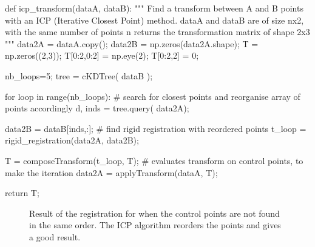 \begin{python}
def icp_transform(dataA, dataB):
    """
    Find a transform between A and B points
    with an ICP (Iterative Closest Point) method.
    dataA and dataB are of size nx2, with the same number of points n 
    returns the transformation matrix of shape 2x3
    """
    data2A = dataA.copy();
    data2B = np.zeros(data2A.shape);  
    T = np.zeros((2,3));
    T[0:2,0:2] = np.eye(2);
    T[0:2,2] = 0;
    
    nb_loops=5;
    tree = cKDTree( dataB );
    
    for loop in range(nb_loops):
        # search for closest points and reorganise array of points accordingly
        d, inds = tree.query( data2A);
        
        data2B = dataB[inds,:];
        # find rigid registration with reordered points
        t_loop = rigid_registration(data2A, data2B);
        
        T = composeTransform(t_loop, T);
        # evaluates transform on control points, to make the iteration
        data2A = applyTransform(dataA, T);
        
    return T;
\end{python}


\begin{figure}[htbp]
\centering\caption{Result of the registration for when the control points are not found in the same order. The ICP algorithm reorders the points and gives a good result.}%
 \hspace*{1.5cm}
 \label{fig:registration:python:icp}%
\end{figure}

